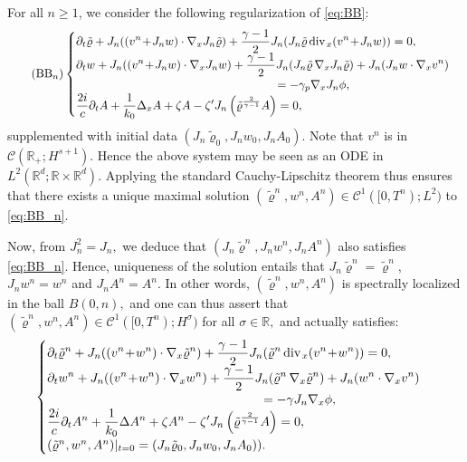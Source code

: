 \documentclass[11pt,twoside]{amsart}
\newcommand\R{\mathbb{R}}
\newcommand{\ds}{\displaystyle}
\renewcommand{\div}{\mbox{\rm div}\;\!}
\def\cC{{\mathcal C}}
\begin{document}
For all $n\geq1$, we consider the following regularization  of \eqref{eq:BB}:
\begin{align}\tag{BB$_n$}
\begin{cases} 
\ds \partial_t\tilde\varrho+J_n((v^n\!+\!J_nw)\cdot\nabla_x J_n\tilde\varrho)+\frac{\gamma-1}2J_n(J_n\tilde\varrho\,\div_x(v^n\!+\!J_nw))=0,\\
\ds \partial_tw+J_n((v^n\!+\!J_nw)\cdot\nabla_x J_nw)+\frac{\gamma-1}2J_n(J_n\tilde\varrho\,\nabla_x J_n\tilde\varrho)+J_n(J_nw\cdot\nabla_x v^n)\\
\hspace{6cm} \ds = -\gamma_p\nabla_x J_n\phi,\\
\ds \frac{2i}{c}\partial_t A+\frac{1}{k_0}\Delta_x A
+\zeta A
-\zeta' J_n \left(\tilde\varrho^{\frac{2}{\gamma-1}} A\right)=0,
\end{cases}\label{eq:BB_n} 
\end{align} 
 supplemented with initial data $(J_n\tilde\varrho_0,J_nw_0,J_nA_0).$ 
\medbreak
Note that $v^n$ is in $\cC(\R_+;H^{s+1}).$ Hence the above system may be seen as an ODE in $L^2(\R^d;\R\times\R^d).$ Applying the standard Cauchy-Lipschitz theorem thus 
ensures that there exists a unique maximal solution $(\tilde \varrho^n,w^n,A^n)\in\cC^1([0,T^n);L^2)$ to \eqref{eq:BB_n}. 

Now, from  $J_n^2=J_n,$ we deduce that  $(J_n\tilde\varrho^n,J_nw^n,J_nA^n)$ also satisfies \eqref{eq:BB_n}. Hence, uniqueness of the solution 
entails that $J_n\tilde\varrho^n=\tilde\varrho^n$, $J_nw^n=w^n$ and $J_nA^n=A^n$.
 In other words, $(\tilde\varrho^n,w^n, A^n)$ is spectrally localized in the ball $B(0,n),$
and one can thus assert that  $(\tilde\varrho^n,w^n,A^n )\in\cC^1([0,T^n);H^\sigma)$ for all $\sigma\in \R,$ 
and  actually satisfies: 
\begin{align}
\begin{cases} 
\ds \partial_t \tilde\varrho^n +J_n((v^n\!+\!w^n)\cdot\nabla_x\tilde\varrho^n)+\frac{\gamma-1}2J_n(\tilde\varrho^n\,\div_x(v^n\!+\!w^n))=0,\\
\ds \partial_t w^n + J_n((v^n\!+\!w^n)\cdot\nabla_x w^n)+\frac{\gamma-1}2J_n(\tilde\varrho^n\,\nabla_x\tilde\varrho^n)+J_n(w^n\cdot\nabla_x v^n)\\
\hspace{6cm}\ds =-\gamma J_n\nabla_x \phi,\\
\ds \frac{2i}{c}\partial_t A^n+\frac{1}{k_0}\Delta A^n
+\zeta A^n
-\zeta'J_n\left(\tilde\varrho^{\frac{2}{\gamma-1}} A\right) = 0,\\
(\tilde\varrho^n,w^n,A^n)|_{t=0}=(J_n\tilde\varrho_0,J_nw_0,J_nA_0)).
\end{cases}\label{eq:J-BB_n}
\end{align}
\end{document}
